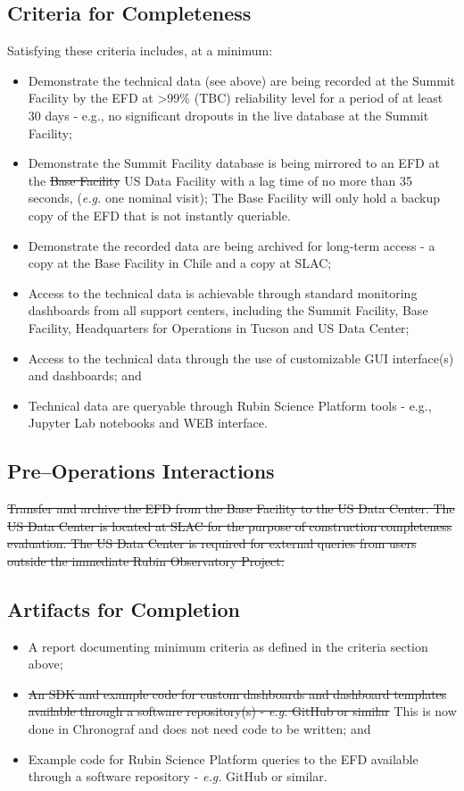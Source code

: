 \subsection{Criteria for Completeness}

Satisfying these criteria includes, at a minimum:
\begin{itemize}
	\item Demonstrate the technical data (see above) are being recorded at the Summit Facility by the EFD at >99\% (TBC) reliability level for a period of at least 30 days - e.g., no significant dropouts in the live database at the Summit Facility;
	\item Demonstrate the Summit Facility database is being mirrored to an EFD at the \sout{Base Facility} US Data Facility with a lag time of no more than 35 seconds, ({\it e.g.} one nominal visit); The Base Facility will only hold a backup copy of the EFD that is not instantly queriable.
	\item Demonstrate the recorded data are being archived for long-term access - a copy at the Base Facility in Chile and a copy at SLAC;
	\item Access to the technical data is achievable through standard monitoring dashboards from all support centers, including the Summit Facility, Base Facility, Headquarters for Operations in Tucson and US Data Center;
	\item Access to the technical data through the use of customizable GUI interface(s) and dashboards; and
	\item Technical data are queryable through Rubin Science Platform tools - e.g., Jupyter Lab notebooks and WEB interface.
\end{itemize}

\subsection{Pre--Operations Interactions}

\sout{Transfer and archive the EFD from the Base Facility to the US Data Center. The US Data Center is located at SLAC for the purpose of construction completeness evaluation. The US Data Center is required for external queries from users outside the immediate Rubin Observatory Project.}

\subsection{Artifacts for Completion}
\begin{itemize}
	\item A report documenting minimum criteria as defined in the criteria section above;
	\item \sout{An SDK and example code for custom dashboards and dashboard templates available through a software repository(s) - {\it e.g.} GitHub or similar} This is now done in Chronograf and does not need code to be written; and
	\item Example code for Rubin Science Platform queries to the EFD available through a software repository - {\it e.g.} GitHub or similar.
\end{itemize}